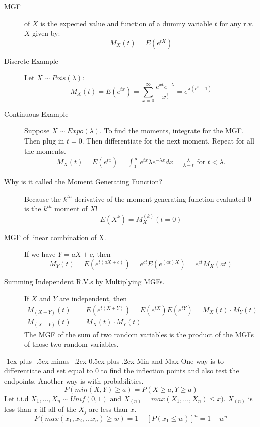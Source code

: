 \documentclass[10pt,landscape]{article}
\makeatletter
\theoremstyle{definition}
\renewcommand{\section}{\@startsection{section}{1}{0mm}%
                                {-1ex plus -.5ex minus -.2ex}%
                                {0.5ex plus .2ex}%
                                {\normalfont\large\bfseries}}
\makeatother
\begin{document}
\begin{multicols}{3}
\begin{description}
    \item[MGF] of $X$ is the expected value and function of a dummy variable $t$ for any r.v. $X$ given by:
        \[ M_X(t) = E(e^{tX}) \]
	\item[Discrete Example] Let $X \sim Pois(\lambda)$:
    \[M_X(t) = E(e^{tx}) = \sum_{x=0}^\infty \frac{e^{xt}e^{-\lambda}}{x!}=e^{\lambda(e^t-1)} \]    
    \item[Continuous Example] Suppose $X \sim Expo(\lambda)$. To find the moments, integrate for the MGF. Then plug in $t=0$. Then differentiate for the next moment. Repeat for all the moments.
    \begin{align*}
       M_X(t)=E(e^{tx})=\int_{0}^{\infty} e^{tx}\lambda e^{-\lambda x} dx = \frac{\lambda}{\lambda - t} \text{ for } t<\lambda.
    \end{align*}
    \item[Why is it called the Moment Generating Function?] Because the $k^{th}$ derivative of the moment generating function evaluated 0 is the $k^{th}$ moment of $X$!
    \[E(X^k) = M_X^{(k)}(t=0)\]

    \item[MGF of linear combination of X.] If we have $Y = aX + c$, then
        \[M_Y(t) = E(e^{t(aX + c)}) =  e^{ct}E(e^{(at)X}) = e^{ct}M_X(at)\]
        
        
    \item[Summing Independent R.V.s by Multiplying MGFs.] If $X$ and $Y$ are independent, then
    \begin{align*}
        M_{(X+Y)}(t) &= E(e^{t(X + Y)}) = E(e^{tX})E(e^{tY}) = M_X(t) \cdot M_Y(t) \\
        M_{(X+Y)}(t) &= M_X(t) \cdot M_Y(t)
    \end{align*}
    The MGF of the sum of two random variables is the product of the MGFs of those two random variables.
\end{description}

\section{Min and Max}
One way is to differentiate and set equal to 0 to find the inflection points and also test the endpoints. Another way is with probabilities. 
\[P(min(X,Y)\geq a)=P(X\geq a, Y \geq a)\]
Let i.i.d $X_1,..., X_n \sim Unif(0,1) \text{ and } X_{(n)}=max(X_1,\dots, X_n)\leq x)$. $X_{(n)}$ is less than $x$ iff all of the $X_j$ are less than $x$. 
\[P(max(x_1,x_2,...x_n) \geq w)=1-[P(x_1\leq w)]^n=1-w^n\]

\end{multicols}
\end{document}
